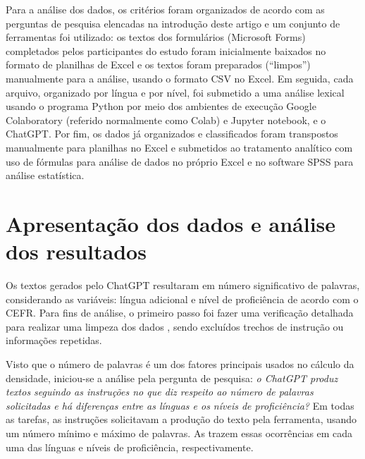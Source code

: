 \documentclass[portuguese]{textolivre}
\begin{document}
Para a análise dos dados, os critérios foram organizados de acordo com as perguntas de pesquisa elencadas na introdução deste artigo e um conjunto de ferramentas foi utilizado: os textos dos formulários (Microsoft Forms) completados pelos participantes do estudo foram inicialmente baixados no formato de planilhas de Excel e os textos foram preparados (“limpos”) manualmente para a análise, usando o formato CSV no Excel. Em seguida, cada arquivo, organizado por língua e por nível, foi submetido a uma análise lexical usando o programa Python por meio dos ambientes de execução Google Colaboratory (referido normalmente como Colab) e Jupyter notebook, e o ChatGPT. Por fim, os dados já organizados e classificados foram transpostos manualmente para planilhas no Excel e submetidos ao tratamento analítico com uso de fórmulas para análise de dados no próprio Excel e no software SPSS para análise estatística.


\section{Apresentação dos dados e análise dos resultados}\label{sec-fmt-manuscrito}
Os textos gerados pelo ChatGPT resultaram em número significativo de palavras, considerando as variáveis: língua adicional e nível de proficiência de acordo com o CEFR. Para fins de análise, o primeiro passo foi fazer uma verificação detalhada para realizar uma limpeza dos dados \cite{schnur_lexical_2021}, sendo excluídos trechos de instrução ou informações repetidas.

Visto que o número de palavras é um dos fatores principais usados no cálculo da densidade, iniciou-se a análise pela pergunta de pesquisa: \textit{o ChatGPT produz textos seguindo as instruções no que diz respeito ao número de palavras solicitadas e há diferenças entre as línguas e os níveis de proficiência?} Em todas as tarefas, as instruções solicitavam a produção do texto pela ferramenta, usando um número mínimo e máximo de palavras. As  trazem essas ocorrências em cada uma das línguas e níveis de proficiência, respectivamente.
\end{document}
